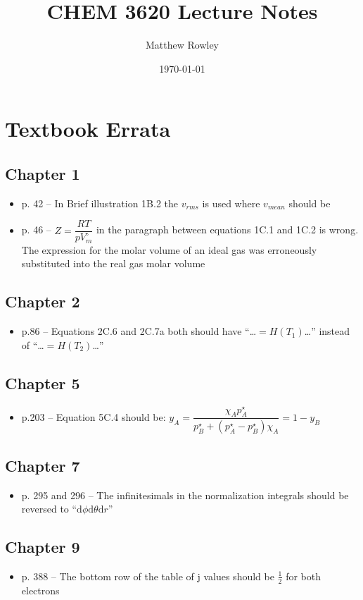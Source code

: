 \documentclass[12pt, openany, letterpaper]{memoir}
\begin{document}
\title{CHEM 3620 Lecture Notes}
\author{Matthew Rowley}
\date{\today}
\mainmatter
\maketitle
\chapter*{Textbook Errata}
\section*{Chapter 1}
\begin{itemize}
	\item p. 42 -- In Brief illustration 1B.2 the $v_{rms}$ is used where $v_{mean}$ should be
	\item p. 46 -- $Z = \dfrac{RT}{pV_m^\circ}$ in the paragraph between equations 1C.1 and 1C.2 is wrong. The expression for the molar volume of an ideal gas was erroneously substituted into the real gas molar volume
\end{itemize}
\section*{Chapter 2}
\begin{itemize}
	\item p.86 -- Equations 2C.6 and 2C.7a both should have ``\ldots$=H(T_1)$\ldots''  instead of ``\ldots$=H(T_2)$\ldots''
\end{itemize}
\section*{Chapter 5}
\begin{itemize}
	\item p.203 -- Equation 5C.4 should be: $y_A = \dfrac{\chi_Ap^\star_A}{p^\star_B+\left(p^\star_A-p^\star_B\right)\chi_A} = 1-y_B$
\end{itemize}
\section*{Chapter 7}
\begin{itemize}
	\item p. 295 and 296 -- The infinitesimals in the normalization integrals should be reversed to “$\mathrm{d}\phi\mathrm{d}\theta\mathrm{d}r$”
\end{itemize}
\section*{Chapter 9}
\begin{itemize}
	\item p. 388 -- The bottom row of the table of j values should be $\frac{1}{2}$ for both electrons
\end{itemize}
\end{document}
